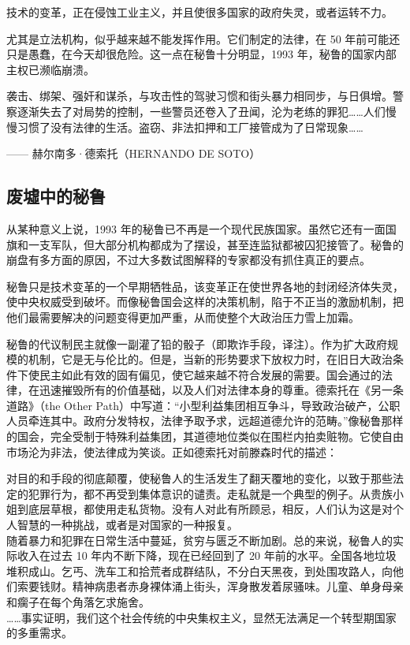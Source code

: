 技术的变革，正在侵蚀工业主义，并且使很多国家的政府失灵，或者运转不力。

尤其是立法机构，似乎越来越不能发挥作用。它们制定的法律，在 50 年前可能还只是愚蠢，在今天却很危险。这一点在秘鲁十分明显，1993 年，秘鲁的国家内部主权已濒临崩溃。

\begin{tcolorbox}
袭击、绑架、强奸和谋杀，与攻击性的驾驶习惯和街头暴力相同步，与日俱增。警察逐渐失去了对局势的控制，一些警员还卷入了丑闻，沦为老练的罪犯……人们慢慢习惯了没有法律的生活。盗窃、非法扣押和工厂接管成为了日常现象……
\end{tcolorbox}
\begin{flushright}
—— 赫尔南多·德索托（HERNANDO DE SOTO）
\end{flushright}

\subsection{废墟中的秘鲁}
从某种意义上说，1993 年的秘鲁已不再是一个现代民族国家。虽然它还有一面国旗和一支军队，但大部分机构都成为了摆设，甚至连监狱都被囚犯接管了。秘鲁的崩盘有多方面的原因，不过大多数试图解释的专家都没有抓住真正的要点。

秘鲁只是技术变革的一个早期牺牲品，该变革正在使世界各地的封闭经济体失灵，使中央权威受到破坏。而像秘鲁国会这样的决策机制，陷于不正当的激励机制，把他们最需要解决的问题变得更加严重，从而使整个大政治压力雪上加霜。

秘鲁的代议制民主就像一副灌了铅的骰子（即欺诈手段，译注）。作为扩大政府规模的机制，它是无与伦比的。但是，当新的形势要求下放权力时，在旧日大政治条件下使民主如此有效的固有偏见，使它越来越不符合发展的需要。国会通过的法律，在迅速摧毁所有的价值基础，以及人们对法律本身的尊重。德索托在《另一条道路》（the Other Path）中写道：“小型利益集团相互争斗，导致政治破产，公职人员牵连其中。政府分发特权，法律予取予求，远超道德允许的范畴。”像秘鲁那样的国会，完全受制于特殊利益集团，其道德地位类似在围栏内拍卖赃物。它使自由市场沦为非法，使法律成为笑谈。正如德索托对前滕森时代的描述：


\begin{tcolorbox}
对目的和手段的彻底颠覆，使秘鲁人的生活发生了翻天覆地的变化，以致于那些法定的犯罪行为，都不再受到集体意识的谴责。走私就是一个典型的例子。从贵族小姐到底层草根，都使用走私货物。没有人对此有所顾忌，相反，人们认为这是对个人智慧的一种挑战，或者是对国家的一种报复。\\
随着暴力和犯罪在日常生活中蔓延，贫穷与匮乏不断加剧。总的来说，秘鲁人的实际收入在过去 10 年内不断下降，现在已经回到了 20 年前的水平。全国各地垃圾堆积成山。乞丐、洗车工和拾荒者成群结队，不分白天黑夜，到处围攻路人，向他们索要钱财。精神病患者赤身裸体涌上街头，浑身散发着尿骚味。儿童、单身母亲和瘸子在每个角落乞求施舍。\\
……事实证明，我们这个社会传统的中央集权主义，显然无法满足一个转型期国家的多重需求。
\end{tcolorbox}

